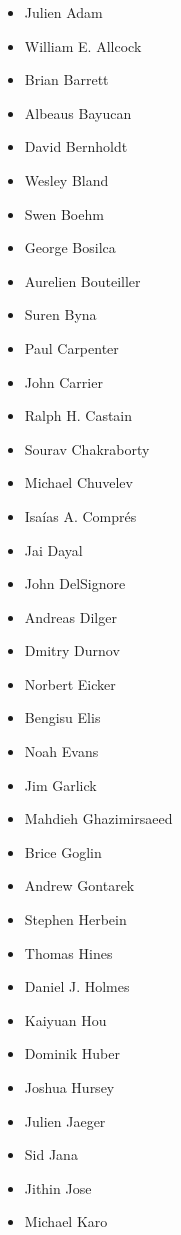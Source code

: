 \begin{itemize}
    \item Julien Adam %
    \item William E. Allcock
    \item Brian Barrett
    \item Albeaus Bayucan
    \item David Bernholdt
    \item Wesley Bland
    \item Swen Boehm
    \item George Bosilca
    \item Aurelien Bouteiller
    \item Suren Byna
    \item Paul Carpenter
    \item John Carrier
    \item Ralph H. Castain
    \item Sourav Chakraborty
    \item Michael Chuvelev
    \item Isaías A. Comprés
    \item Jai Dayal
    \item John DelSignore
    \item Andreas Dilger
    \item Dmitry Durnov
    \item Norbert Eicker
    \item Bengisu Elis
    \item Noah Evans
    \item Jim Garlick
    \item Mahdieh Ghazimirsaeed
    \item Brice Goglin
    \item Andrew Gontarek
    \item Stephen Herbein
    \item Thomas Hines
    \item Daniel J. Holmes
    \item Kaiyuan Hou
    \item Dominik Huber
    \item Joshua Hursey
    \item Julien Jaeger
    \item Sid Jana
    \item Jithin Jose
    \item Michael Karo

\end{itemize}
